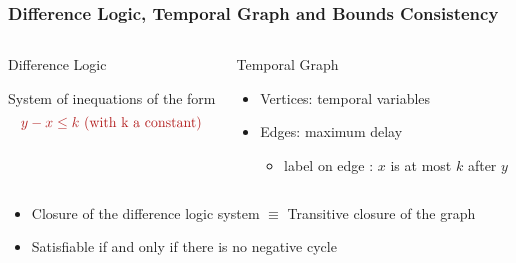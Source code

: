 
\begin{frame}
\frametitle{Difference Logic, Temporal Graph and Bounds Consistency}

\begin{columns}


\begin{myblock}{Difference Logic}

System of inequations of the form
\[
\memph{y - x \leq k \textrm{~(with k a constant)}}
\]




\end{myblock}


\begin{myblock}{Temporal Graph}

\begin{itemize}
  \item Vertices: temporal variables

  \vfill
  \item Edges: maximum delay

\vfill
\begin{itemize}
  \item label  on edge : $x$ is at most $k$ after $y$
\end{itemize}
  
\end{itemize}

\end{myblock}

\end{columns}

\vfill

\begin{itemize}
  \item Closure of the difference logic system $\equiv$ Transitive closure of the graph

  \vfill
  \item Satisfiable if and only if there is no negative cycle 
\end{itemize}




\end{frame}


